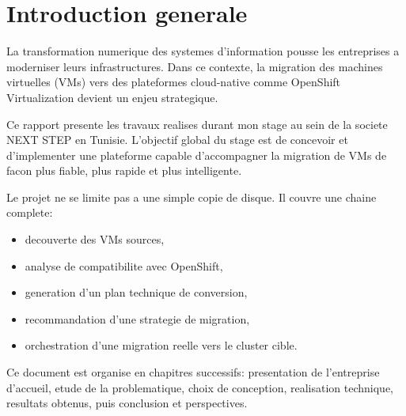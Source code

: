 ﻿\chapter*{Introduction generale}

La transformation numerique des systemes d'information pousse les entreprises a moderniser leurs infrastructures. Dans ce contexte, la migration des machines virtuelles (VMs) vers des plateformes cloud-native comme OpenShift Virtualization devient un enjeu strategique.

Ce rapport presente les travaux realises durant mon stage au sein de la societe NEXT STEP en Tunisie. L'objectif global du stage est de concevoir et d'implementer une plateforme capable d'accompagner la migration de VMs de facon plus fiable, plus rapide et plus intelligente.

Le projet ne se limite pas a une simple copie de disque. Il couvre une chaine complete:
\begin{itemize}[leftmargin=1.2cm]
  \item decouverte des VMs sources,
  \item analyse de compatibilite avec OpenShift,
  \item generation d'un plan technique de conversion,
  \item recommandation d'une strategie de migration,
  \item orchestration d'une migration reelle vers le cluster cible.
\end{itemize}

Ce document est organise en chapitres successifs: presentation de l'entreprise d'accueil, etude de la problematique, choix de conception, realisation technique, resultats obtenus, puis conclusion et perspectives.
